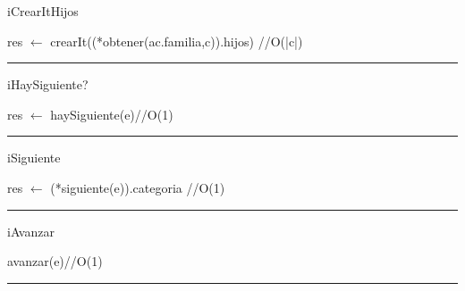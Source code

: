 \begin{algorithm}[H]
\caption{iCrearItHijos}
\begin{algorithmic}[1]
\State res $\gets$ crearIt((*obtener(ac.familia,c)).hijos) \hfill //O(|c|)
\EndFunction 
\end{algorithmic}
\hrule
{}
\end{algorithm}

\begin{algorithm}[H]
\caption{iHaySiguiente?}
\begin{algorithmic}[1]
\state res $\gets$ haySiguiente(e)\hfill //O(1)
\EndFunction 
\end{algorithmic}
\hrule
{}
\end{algorithm}

\begin{algorithm}[H]
\caption{iSiguiente}
\begin{algorithmic}[1]
\state res $\gets$ (*siguiente(e)).categoria \hfill //O(1)
\EndFunction 
\end{algorithmic}
\hrule
{}
\end{algorithm}

\begin{algorithm}[H]
\caption{iAvanzar}
\begin{algorithmic}[1]
\state avanzar(e)\hfill //O(1)
\EndFunction 
\end{algorithmic}
\hrule
{}
\end{algorithm}